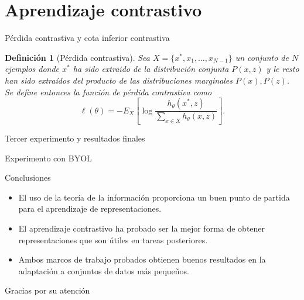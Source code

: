 \documentclass[aspectratio=169]{beamer}
\newtheorem{defi}{Definición}
\begin{document}
  \section{Aprendizaje contrastivo}


      

  
  \begin{frame}{Pérdida contrastiva y cota inferior contrastiva}
    
    \begin{defi}[Pérdida contrastiva]

      Sea \(X =\{x^*,x_1,\dots,x_{N-1}\}\) un conjunto de \(N\) ejemplos donde $x^*$ ha sido extraido de la distribución conjunta \(P(x,z)\) y le resto han sido extraídos del producto de las distribuciones marginales \(P(x),P(z)\). Se define entonces la función de pérdida contrastiva como  
      \[ 
        \ell(\theta) = - E_X \left[ \log \frac{h_\theta(x^*,z)}{\sum_{x \in X}h_\theta(x,z)}\right]. 
        \]
    \end{defi}

  
  \end{frame}




  
  
  \begin{frame}{Tercer experimento y resultados finales}

  \end{frame}

  
  
  \begin{frame}{Experimento con BYOL}

  
  
  
  \end{frame}
  

  


  
  \begin{frame}{Conclusiones}

    \begin{itemize}
      \item El uso de la teoría de la información proporciona un buen punto de partida para el aprendizaje de representaciones.
      \item El aprendizaje contrastivo ha probado ser la mejor forma de obtener representaciones que son útiles en tareas posteriores.
      \item Ambos marcos de trabajo probados obtienen buenos resultados en la adaptación a conjuntos de datos más pequeños.
    \end{itemize}
  \end{frame}
  
  \appendix

  \begin{frame}
    Gracias por su atención
  \end{frame}
\end{document}
